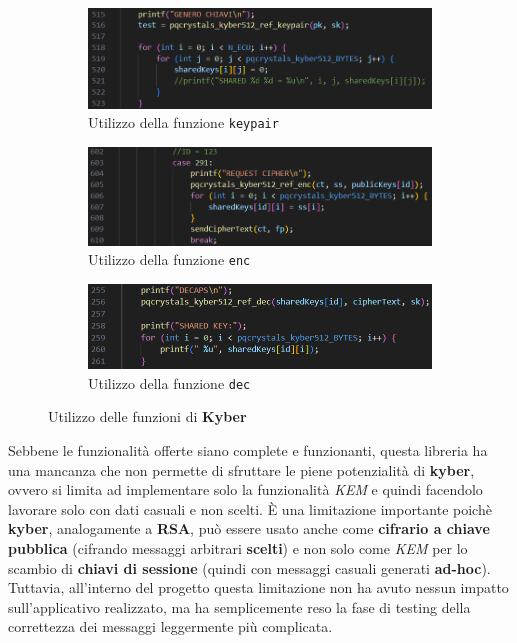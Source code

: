 \begin{figure}[h]
    \begin{subfigure}{0.45\textwidth}
        \includegraphics[width=1\textwidth]{capitoli/figure-implementazione/kyber-keypair.png}
        \caption{Utilizzo della funzione \texttt{keypair}}
        \label{fig:kyber-keypair}
    \end{subfigure}
    \begin{subfigure}{0.45\textwidth}
        \includegraphics[width=1\textwidth]{capitoli/figure-implementazione/kyber-enc.png}
        \caption{Utilizzo della funzione \texttt{enc}}
        \label{fig:kyber-enc}
    \end{subfigure}
    \centering
    \begin{subfigure}{0.5\textwidth}
        \includegraphics[width=1\textwidth]{capitoli/figure-implementazione/kyber-dec.png}
        \caption{Utilizzo della funzione \texttt{dec}}
        \label{fig:kyber-dec}
    \end{subfigure}
    \caption{Utilizzo delle funzioni di \textbf{Kyber}}
    \label{fig:kyber-functions}
\end{figure}

Sebbene le funzionalità offerte siano complete e funzionanti, questa libreria ha una mancanza che non permette di sfruttare le piene potenzialità di \textbf{kyber}, ovvero si limita ad implementare solo la funzionalità \emph{KEM} e quindi facendolo lavorare solo con dati casuali e non scelti. È una limitazione importante poichè \textbf{kyber}, analogamente a \textbf{RSA}, può essere usato anche come \textbf{cifrario a chiave pubblica} (cifrando messaggi arbitrari \textbf{scelti}) e non solo come \emph{KEM} per lo scambio di \textbf{chiavi di sessione} (quindi con messaggi casuali generati \textbf{ad-hoc}). Tuttavia, all'interno del progetto questa limitazione non ha avuto nessun impatto sull'applicativo realizzato, ma ha semplicemente reso la fase di testing della correttezza dei messaggi leggermente più complicata.

